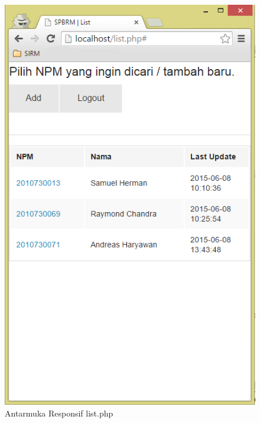 \begin{figure}[H]
\centering
\includegraphics[scale=0.44]{Gambar/pengujian18.png}
\caption[Antarmuka Responsif list.php]{Antarmuka Responsif list.php} 
\label{fig:responsiflist}
\end{figure}

